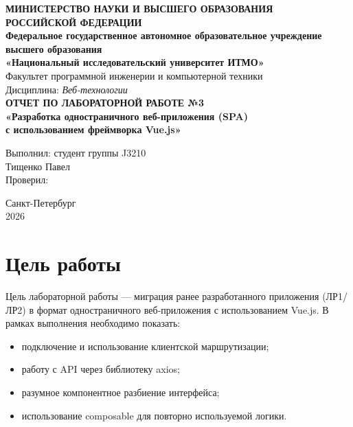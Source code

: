 \documentclass[a4paper,12pt]{article}
\begin{document}
\begin{titlepage}
    \begin{center}
        \textbf{МИНИСТЕРСТВО НАУКИ И ВЫСШЕГО ОБРАЗОВАНИЯ\\
        РОССИЙСКОЙ ФЕДЕРАЦИИ}\\[0.5cm]

        \textbf{Федеральное государственное автономное образовательное учреждение\\
        высшего образования\\
        «Национальный исследовательский университет ИТМО»}\\[1.5cm]

        Факультет программной инженерии и компьютерной техники\\
        Дисциплина: \textit{Веб-технологии}\\[3cm]

        {\Large \textbf{ОТЧЕТ ПО ЛАБОРАТОРНОЙ РАБОТЕ №3}}\\[0.4cm]
        {\large \textbf{«Разработка одностраничного веб-приложения (SPA)\\
        с использованием фреймворка Vue.js»}}\\[3cm]

        \begin{flushright}
            Выполнил: студент группы J3210\\
            Тищенко Павел\\[0.3cm]
            Проверил: \underline{\hspace{4cm}}
        \end{flushright}

        \vfill
        Санкт-Петербург\\
        2026
    \end{center}
\end{titlepage}

\tableofcontents
\newpage

\section{Цель работы}
Цель лабораторной работы --- миграция ранее разработанного приложения (ЛР1/ЛР2) в формат одностраничного веб-приложения с использованием Vue.js. В рамках выполнения необходимо показать:
\begin{itemize}
    \item подключение и использование клиентской маршрутизации;
    \item работу с API через библиотеку axios;
    \item разумное компонентное разбиение интерфейса;
    \item использование composable для повторно используемой логики.
\end{itemize}
\end{document}
